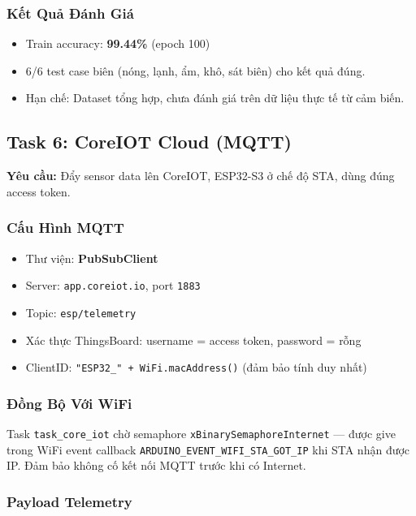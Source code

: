 \documentclass[12pt,a4paper]{article}
\begin{document}
\subsubsection{Kết Quả Đánh Giá}

\begin{itemize}
    \item Train accuracy: \textbf{99.44\%} (epoch 100)
    \item 6/6 test case biên (nóng, lạnh, ẩm, khô, sát biên) cho kết quả đúng.
    \item Hạn chế: Dataset tổng hợp, chưa đánh giá trên dữ liệu thực tế từ cảm biến.
\end{itemize}

\subsection{Task 6: CoreIOT Cloud (MQTT)}

\textbf{Yêu cầu:} Đẩy sensor data lên CoreIOT, ESP32-S3 ở chế độ STA, dùng đúng access token.

\subsubsection{Cấu Hình MQTT}

\begin{itemize}
    \item Thư viện: \textbf{PubSubClient}
    \item Server: \texttt{app.coreiot.io}, port \texttt{1883}
    \item Topic: \texttt{esp/telemetry}
    \item Xác thực ThingsBoard: username = access token, password = rỗng
    \item ClientID: \texttt{"ESP32\_" + WiFi.macAddress()} (đảm bảo tính duy nhất)
\end{itemize}

\subsubsection{Đồng Bộ Với WiFi}

Task \texttt{task\_core\_iot} chờ semaphore \texttt{xBinarySemaphoreInternet} — được give trong WiFi event callback \texttt{ARDUINO\_EVENT\_WIFI\_STA\_GOT\_IP} khi STA nhận được IP. Đảm bảo không cố kết nối MQTT trước khi có Internet.

\subsubsection{Payload Telemetry}
\end{document}
